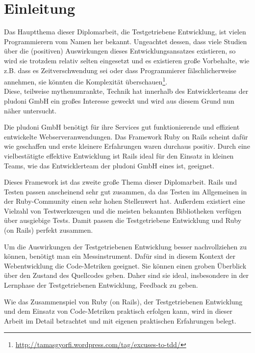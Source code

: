 \chapter{Einleitung}

Das Hauptthema dieser Diplomarbeit, die Testgetriebene Entwicklung, ist vielen Programmierern vom Namen her bekannt. Ungeachtet dessen, dass viele Studien über die (positiven) Auswirkungen dieses Entwicklungsansatzes existieren, so wird sie trotzdem relativ selten eingesetzt und es existieren große Vorbehalte, wie z.B. dass es Zeitverschwendung sei oder dass Programmierer fälschlicherweise annehmen, sie könnten die Komplexität überschauen\footnote{\url{http://tamasgyorfi.wordpress.com/tag/excuses-to-tdd/}}.\\
Diese, teilweise mythenumrankte, Technik hat innerhalb des Entwicklerteams der pludoni GmbH ein großes Interesse geweckt und wird aus diesem Grund nun näher untersucht.

Die pludoni GmbH benötigt für ihre Services gut funktionierende und effizient entwickelte Webserveranwendungen. Das Framework Ruby on Rails scheint dafür wie geschaffen und erste kleinere Erfahrungen waren durchaus positiv. Durch eine vielbestätigte effektive Entwicklung ist Rails ideal für den Einsatz in kleinen Teams, wie das Entwicklerteam der pludoni GmbH eines ist, geeignet.

Dieses Framework ist das zweite große Thema dieser Diplomarbeit. Rails und Testen passen anscheinend sehr gut zusammen, da das Testen im Allgemeinen in der Ruby-Community einen sehr hohen Stellenwert hat. Außerdem existiert eine Vielzahl von Testwerkzeugen und die meisten bekannten Bibliotheken verfügen über ausgiebige Tests. Damit passen die Testgetriebene Entwicklung und Ruby (on Rails) perfekt zusammen.

Um die Auswirkungen der Testgetriebenen Entwicklung besser nachvollziehen zu können, benötigt man ein Messinstrument. Dafür sind in diesem Kontext der Webentwicklung die Code-Metriken geeignet. Sie können einen groben Überblick über den Zustand des Quellcodes geben. Daher sind sie ideal, insbesondere in der Lernphase der Testgetriebenen Entwicklung, Feedback zu geben.

Wie das Zusammenspiel von Ruby (on Rails), der Testgetriebenen Entwicklung und dem Einsatz von Code-Metriken praktisch erfolgen kann, wird in dieser Arbeit im Detail betrachtet und mit eigenen praktischen Erfahrungen belegt.

